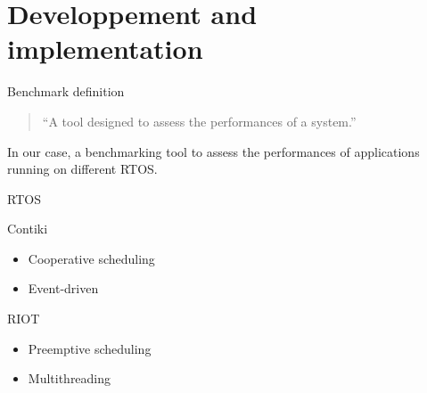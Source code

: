 \documentclass{beamer}
\begin{document}

\hypertarget{developpement-and-implementation}{%
\section{Developpement and
implementation}\label{developpement-and-implementation}}

\begin{frame}{Benchmark definition}
\protect\hypertarget{benchmark-definition}{}

\begin{quote}
``A tool designed to assess the performances of a system.''
\end{quote}

In our case, a benchmarking tool to assess the performances of
applications running on different RTOS.

\end{frame}


\begin{frame}{RTOS}
\protect\hypertarget{rtos}{}

\begin{block}{Contiki}

\begin{itemize}
\tightlist
\item
  Cooperative scheduling
\item
  Event-driven
\end{itemize}

\end{block}

\begin{block}{RIOT}

\begin{itemize}
\tightlist
\item
  Preemptive scheduling
\item
  Multithreading
\end{itemize}

\end{block}

\end{frame}

\end{document}
